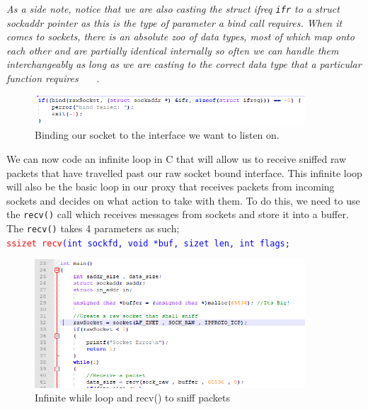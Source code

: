 \emph{As a side note, notice that we are also casting the struct ifreq {\tt ifr} to a struct sockaddr pointer as this is the type of parameter a bind call requires. When it comes to sockets, there is an absolute zoo of data types, most of which map onto each other and are partially identical internally so often we can handle them interchangeably as long as we are casting to the correct data type that a particular function requires} ~\cite{35}~\cite{39}~\cite{40}.  \\

\begin{figure}[h!]
    \centering
    \includegraphics[width=0.9\textwidth]{Bind.PNG}
    \caption{Binding our socket to the interface we want to listen on. }
    \label{fig: Raw Socket Traversal}
\end{figure}

We can now code an infinite loop in C that will allow us to receive sniffed raw packets that have travelled past our raw socket bound interface. This infinite loop will also be the basic loop in our proxy that receives packets from incoming sockets and decides on what action to take with them. To do this, we need to use the {\tt recv()} call which receives messages from sockets and store it into a buffer. The {\tt recv()} takes 4 parameters as such; \\
{\tt \textcolor{red}{ssize\textunderscore t\ recv}\textcolor{blue}{(int sockfd, void *buf, size\textunderscore t len, int flags};}\\


\begin{figure}[h!]
    \centering
    \includegraphics[width=0.9\textwidth]{InfiniteSniff.PNG}
    \caption{Infinite while loop and recv() to sniff packets}
    \label{fig: Recv} 
\end{figure}
                 
